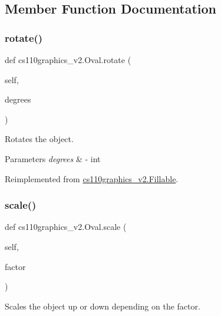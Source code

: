 \subsection{Member Function Documentation}
\mbox{\label{classcs110graphics__v2_1_1Oval_af8c159d2ab0f84dd27099639c9b002d3}} 
\subsubsection{\texorpdfstring{rotate()}{rotate()}}
{\footnotesize\ttfamily def cs110graphics\+\_\+v2.\+Oval.\+rotate (\begin{DoxyParamCaption}\item[{}]{self,  }\item[{}]{degrees }\end{DoxyParamCaption})}



Rotates the object. 


\begin{DoxyParams}{Parameters}
{\em degrees} & -\/ int \\
\hline
\end{DoxyParams}


Reimplemented from \mbox{\hyperlink{classcs110graphics__v2_1_1Fillable_aee03142975056e9f3cbd5b7b5f81bcb7}{cs110graphics\+\_\+v2.\+Fillable}}.

\mbox{\label{classcs110graphics__v2_1_1Oval_abb433bbfccb014b097f09c063530a4e0}} 
\subsubsection{\texorpdfstring{scale()}{scale()}}
{\footnotesize\ttfamily def cs110graphics\+\_\+v2.\+Oval.\+scale (\begin{DoxyParamCaption}\item[{}]{self,  }\item[{}]{factor }\end{DoxyParamCaption})}



Scales the object up or down depending on the factor. 


